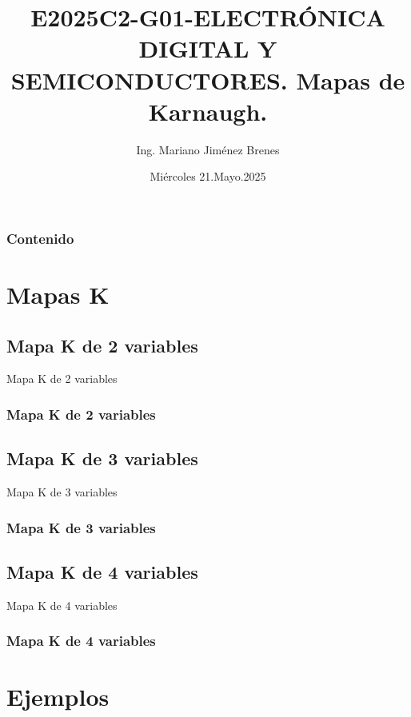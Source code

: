 \documentclass[11pt]{beamer}
\author{Ing. Mariano Jim\'enez Brenes}
\title
{
E2025C2-G01-ELECTRÓNICA DIGITAL Y SEMICONDUCTORES.\linebreak
Mapas de Karnaugh.
}
\institute{
Universidad Castro Carazo\linebreak
T\'ecnico En Semiconductores
}
\date{Mi\'ercoles 21.Mayo.2025}
\begin{document}
\begin{frame}
\maketitle 
\end{frame}

\logo{}

\begin{frame}
\frametitle{Contenido}
\tableofcontents
\end{frame}


\section{Mapas K}
	\subsection{Mapa K de 2 variables}
	\begin{frame}{Mapa K de 2 variables}
	\frametitle{Mapa K de 2 variables}

	\end{frame}

	\subsection{Mapa K de 3 variables}
	\begin{frame}{Mapa K de 3 variables}
	\frametitle{Mapa K de 3 variables}

	\end{frame}

	\subsection{Mapa K de 4 variables}
	\begin{frame}{Mapa K de 4 variables}
	\frametitle{Mapa K de 4 variables}

	\end{frame}

\section{Ejemplos}
\end{document}
